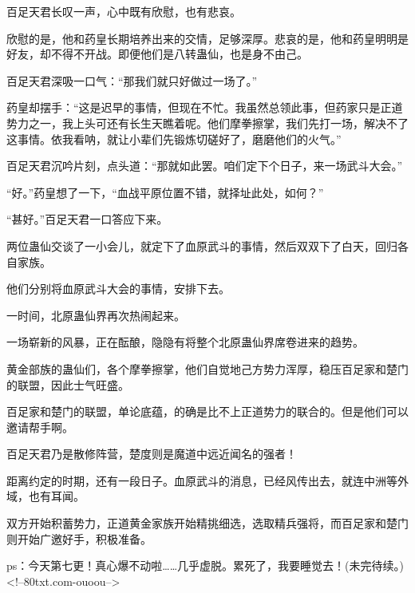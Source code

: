 \begin{this_body}
百足天君长叹一声，心中既有欣慰，也有悲哀。

欣慰的是，他和药皇长期培养出来的交情，足够深厚。悲哀的是，他和药皇明明是好友，却不得不开战。即便他们是八转蛊仙，也是身不由己。

百足天君深吸一口气：“那我们就只好做过一场了。”

药皇却摆手：“这是迟早的事情，但现在不忙。我虽然总领此事，但药家只是正道势力之一，我上头可还有长生天瞧着呢。他们摩拳擦掌，我们先打一场，解决不了这事情。依我看呐，就让小辈们先锻炼切磋好了，磨磨他们的火气。”

百足天君沉吟片刻，点头道：“那就如此罢。咱们定下个日子，来一场武斗大会。”

“好。”药皇想了一下，“血战平原位置不错，就择址此处，如何？”

“甚好。”百足天君一口答应下来。

两位蛊仙交谈了一小会儿，就定下了血原武斗的事情，然后双双下了白天，回归各自家族。

他们分别将血原武斗大会的事情，安排下去。

一时间，北原蛊仙界再次热闹起来。

一场崭新的风暴，正在酝酿，隐隐有将整个北原蛊仙界席卷进来的趋势。

黄金部族的蛊仙们，各个摩拳擦掌，他们自觉地己方势力浑厚，稳压百足家和楚门的联盟，因此士气旺盛。

百足家和楚门的联盟，单论底蕴，的确是比不上正道势力的联合的。但是他们可以邀请帮手啊。

百足天君乃是散修阵营，楚度则是魔道中远近闻名的强者！

距离约定的时期，还有一段日子。血原武斗的消息，已经风传出去，就连中洲等外域，也有耳闻。

双方开始积蓄势力，正道黄金家族开始精挑细选，选取精兵强将，而百足家和楚门则开始广邀好手，积极准备。

ps：今天第七更！真心爆不动啦……几乎虚脱。累死了，我要睡觉去！(未完待续。)<!--80txt.com-ouoou-->

\end{this_body}


